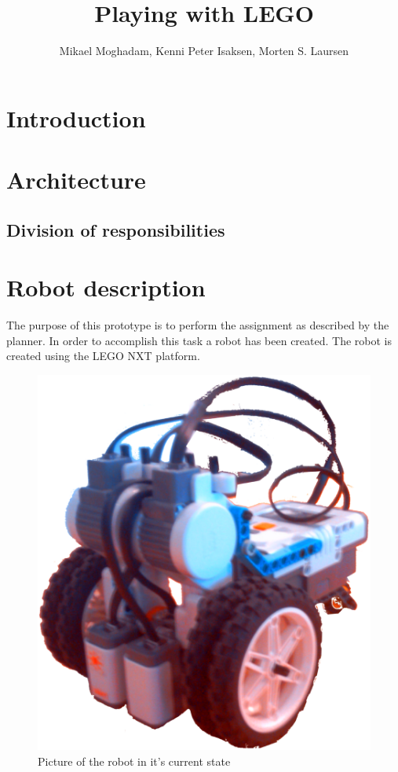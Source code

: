 \documentclass[draft, english, a4paper, 10pt]{article}
\title{Playing with LEGO}
\author{Mikael Moghadam, Kenni Peter Isaksen, Morten S. Laursen}
\begin{document}
\maketitle %


%
%
\section{Introduction}
\newpage
\tableofcontents
\newpage
\section{Architecture}
	\subsection{Division of responsibilities}
	
\section{Robot description}
        The purpose of this prototype is to perform the assignment as described by
        the planner. In order to accomplish this task a robot 
        has been created. The robot is created using the LEGO NXT platform. 
        \begin{figure}[htp]
            \centering
    	    \includegraphics[scale=0.1]{robot}
	        \caption{Picture of the robot in it's current state}\label{fig:robotPic}
        \end{figure} 
\end{document}
